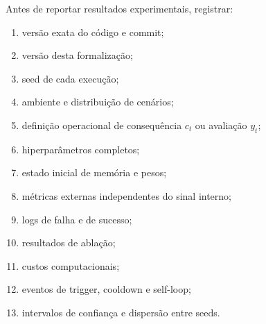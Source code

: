 Antes de reportar resultados experimentais, registrar:
\begin{enumerate}
\item versão exata do código e commit;
\item versão desta formalização;
\item seed de cada execução;
\item ambiente e distribuição de cenários;
\item definição operacional de consequência \(c_t\) ou avaliação \(y_t\);
\item hiperparâmetros completos;
\item estado inicial de memória e pesos;
\item métricas externas independentes do sinal interno;
\item logs de falha e de sucesso;
\item resultados de ablação;
\item custos computacionais;
\item eventos de trigger, cooldown e self-loop;
\item intervalos de confiança e dispersão entre seeds.
\end{enumerate}


